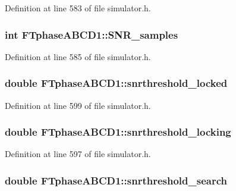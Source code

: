 Definition at line 583 of file simulator.h.

\hypertarget{classFTphaseABCD1_ae8a18512bd4410aeca3fa71a95b72fe2}{
\subsubsection[{SNR\_\-samples}]{\setlength{\rightskip}{0pt plus 5cm}int {\bf FTphaseABCD1::SNR\_\-samples}}}
\label{classFTphaseABCD1_ae8a18512bd4410aeca3fa71a95b72fe2}


Definition at line 585 of file simulator.h.

\hypertarget{classFTphaseABCD1_a5a3b4f72cb9c82e0d41994c9643e7cd9}{
\subsubsection[{snrthreshold\_\-locked}]{\setlength{\rightskip}{0pt plus 5cm}double {\bf FTphaseABCD1::snrthreshold\_\-locked}}}
\label{classFTphaseABCD1_a5a3b4f72cb9c82e0d41994c9643e7cd9}


Definition at line 599 of file simulator.h.

\hypertarget{classFTphaseABCD1_a53a95d07f82612a86f6d24ac82e85a90}{
\subsubsection[{snrthreshold\_\-locking}]{\setlength{\rightskip}{0pt plus 5cm}double {\bf FTphaseABCD1::snrthreshold\_\-locking}}}
\label{classFTphaseABCD1_a53a95d07f82612a86f6d24ac82e85a90}


Definition at line 597 of file simulator.h.

\hypertarget{classFTphaseABCD1_a2bb0324af5553be269fec147d808e9f0}{
\subsubsection[{snrthreshold\_\-search}]{\setlength{\rightskip}{0pt plus 5cm}double {\bf FTphaseABCD1::snrthreshold\_\-search}}}
\label{classFTphaseABCD1_a2bb0324af5553be269fec147d808e9f0}



